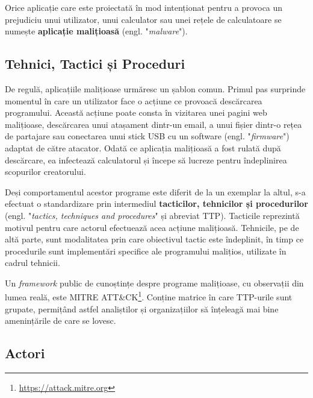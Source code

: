 \documentclass[../../main.tex]{subfiles}
\begin{document}
Orice aplicație care este proiectată în mod intenționat pentru a provoca un prejudiciu unui utilizator, unui calculator sau unei rețele de calculatoare se numește \textbf{aplicație malițioasă} (engl. "\textit{malware}").

\subsection{Tehnici, Tactici și Proceduri}

De regulă, aplicațiile malițioase urmăresc un șablon comun. Primul pas surprinde momentul în care un utilizator face o acțiune ce provoacă descărcarea programului. Această acțiune poate consta în vizitarea unei pagini web malițioase, descărcarea unui atașament dintr-un email, a unui fișier dintr-o rețea de partajare sau conectarea unui stick USB cu un software (engl. "\textit{firmware}") adaptat de către atacator. Odată ce aplicația malițioasă a fost rulată după descărcare, ea infectează calculatorul și începe să lucreze pentru îndeplinirea scopurilor creatorului.

Deși comportamentul acestor programe este diferit de la un exemplar la altul, s-a efectuat o standardizare prin intermediul \textbf{tacticilor, tehnicilor și procedurilor} (engl. "\textit{tactics, techniques and procedures}" și abreviat TTP). Tacticile reprezintă motivul pentru care actorul efectuează acea acțiune malițioasă. Tehnicile, pe de altă parte, sunt modalitatea prin care obiectivul tactic este îndeplinit, în timp ce procedurile sunt implementări specifice ale programului malițios, utilizate în cadrul tehnicii.

Un \textit{framework} public de cunoștințe despre programe malițioase, cu observații din lumea reală, este MITRE ATT\&CK\footnote{\href{https://attack.mitre.org}{https://attack.mitre.org}}. Conține matrice în care TTP-urile sunt grupate, permițând astfel analiștilor și organizațiilor să înțeleagă mai bine amenințările de care se lovesc.

\subsection{Actori}
\end{document}
